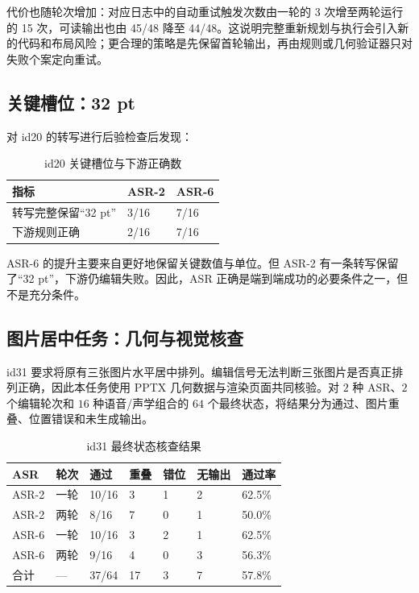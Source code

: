 \documentclass[11pt,a4paper,UTF8,fontset=fandol]{ctexart}
\begin{document}
代价也随轮次增加：对应日志中的自动重试触发次数由一轮的 3 次增至两轮运行的 15 次，可读输出也由 45/48 降至 44/48。这说明完整重新规划与执行会引入新的代码和布局风险；更合理的策略是先保留首轮输出，再由规则或几何验证器只对失败个案定向重试。

\subsection{关键槽位：32 pt}

对 id20 的转写进行后验检查后发现：

\begin{table}[H]
\centering
\caption{id20 关键槽位与下游正确数}
\small
\begin{tabularx}{0.78\textwidth}{Y C{3.2cm} C{3.2cm}}
\toprule
指标 & ASR-2 & ASR-6 \\
\midrule
转写完整保留“32 pt” & 3/16 & 7/16 \\
下游规则正确 & 2/16 & 7/16 \\
\bottomrule
\end{tabularx}
\end{table}

ASR-6 的提升主要来自更好地保留关键数值与单位。但 ASR-2 有一条转写保留了“32 pt”，下游仍编辑失败。因此，ASR 正确是端到端成功的必要条件之一，但不是充分条件。

\subsection{图片居中任务：几何与视觉核查}

id31 要求将原有三张图片水平居中排列。编辑信号无法判断三张图片是否真正排列正确，因此本任务使用 PPTX 几何数据与渲染页面共同核验。对 $2$ 种 ASR、$2$ 个编辑轮次和 $16$ 种语音/声学组合的 $64$ 个最终状态，将结果分为通过、图片重叠、位置错误和未生成输出。

\begin{table}[H]
\centering
\caption{id31 最终状态核查结果}
\small
\begin{tabularx}{\textwidth}{Y C{1.4cm} C{1.7cm} C{1.5cm} C{1.5cm} C{1.7cm} C{1.8cm}}
\toprule
ASR & 轮次 & 通过 & 重叠 & 错位 & 无输出 & 通过率 \\
\midrule
ASR-2 & 一轮 & 10/16 & 3 & 1 & 2 & 62.5\% \\
ASR-2 & 两轮 & 8/16 & 7 & 0 & 1 & 50.0\% \\
ASR-6 & 一轮 & 10/16 & 3 & 2 & 1 & 62.5\% \\
ASR-6 & 两轮 & 9/16 & 4 & 0 & 3 & 56.3\% \\
\midrule
合计 & --- & 37/64 & 17 & 3 & 7 & 57.8\% \\
\bottomrule
\end{tabularx}
\end{table}
\end{document}
